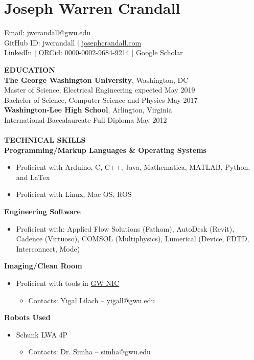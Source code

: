 \chapter*{Joseph Warren Crandall}
\begin{singlespace}
\begin{center}
Email: jwcrandall@gwu.edu \\
GitHub ID: jwcrandall $\vert{}$ \href{http://www.josephcrandall.com}{josephcrandall.com}  \\
\href{http://www.linkedin.com/in/joseph-crandall-67003570}{LinkedIn} $\vert{}$ ORCid: 0000-0002-9684-9214 $\vert{}$ \href{https://scholar.google.com/citations?user=gUec2noAAAAJ\&hl=en}{Google Scholar}\\
\end{center}
\textbf{EDUCATION}\\
\textbf{The George Washington University}, Washington, DC\\
Master of Science, Electrical Engineering \hfill expected May 2019\\
Bachelor of Science, Computer Science and Physics \hfill May 2017\\
\textbf{Washington-Lee High School}, Arlington, Virginia\\
International Baccalaureate Full Diploma \hfill May 2012\\\\
\textbf{TECHNICAL SKILLS}\\
\textbf{Programming/Markup Languages \& Operating Systems}
\begin{itemize}
	\item Proficient with Arduino, C, C++, Java, Mathematica, MATLAB, Python, and LaTex
	\item Proficient with Linux, Mac OS, ROS
\end{itemize}
\textbf{Engineering Software}
\begin{itemize}
	\item Proficient with: Applied Flow Solutions (Fathom), AutoDesk (Revit), Cadence (Virtuoso), COMSOL (Multiphysics), Lumerical (Device, FDTD, Interconnect, Mode)
\end{itemize}
\textbf{Imaging/Clean Room}
\begin{itemize}
	\item Proficient with tools in \href{https://nic.gwu.edu/}{ GW NIC}
\begin{itemize}
	\item Contacts: Yigal Lilach – yigall@gwu.edu
\end{itemize}
\end{itemize}
\textbf{Robots Used}
\begin{itemize}
	\item Schunk LWA 4P
\begin{itemize}
	\item Contacts: Dr. Simha -- simha@gwu.edu
\end{itemize}
\end{itemize}


\end{singlespace}
